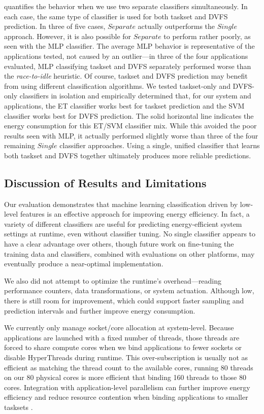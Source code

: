  quantifies the behavior when we use two separate classifiers simultaneously.
In each case, the same type of classifier is used for both taskset and DVFS prediction.
In three of five cases, $Separate$ actually outperforms the $Single$ approach.
However, it is also possible for $Separate$ to perform rather poorly, as seen with the MLP classifier.
The average MLP behavior is representative of the applications tested, \ie not caused by an outlier---in three of the four applications evaluated, MLP classifying taskset and DVFS separately performed worse than the \emph{race-to-idle} heuristic.
Of course, taskset and DVFS prediction may benefit from using different classification algorithms.
We tested taskset-only and DVFS-only classifiers in isolation and empirically determined that, for our system and applications, the ET classifier works best for taskset prediction and the SVM classifier works best for DVFS prediction.
The solid horizontal line indicates the energy consumption for this ET/SVM classifier mix.
While this avoided the poor results seen with MLP, it actually performed slightly worse than three of the four remaining $Single$ classifier approaches.
Using a single, unified classifier that learns both taskset and DVFS together ultimately produces more reliable predictions.


\subsection{Discussion of Results and Limitations}
\label{sec:eval-discuss}

Our evaluation demonstrates that machine learning classification driven by low-level features is an effective approach for improving energy efficiency.
In fact, a variety of different classifiers are useful for predicting energy-efficient system settings at runtime, even without classifier tuning.
No single classifier appears to have a clear advantage over others, though future work on fine-tuning the training data and classifiers, combined with evaluations on other platforms, may eventually produce a near-optimal implementation.

We also did not attempt to optimize the runtime's overhead---reading performance counters, data transformations, or system actuation.
Although low, there is still room for improvement, which could support faster sampling and prediction intervals and further improve energy consumption.

We currently only manage socket/core allocation at system-level.
Because applications are launched with a fixed number of threads, those threads are forced to share compute cores when we bind applications to fewer sockets or disable HyperThreads during runtime.
This over-subscription is usually not as efficient as matching the thread count to the available cores, \eg running 80 threads on our 80 physical cores is more efficient that binding 160 threads to those 80 cores.
Integration with application-level parallelism can further improve energy efficiency and reduce resource contention when binding applications to smaller tasksets \cite{Sridharan2013}.

